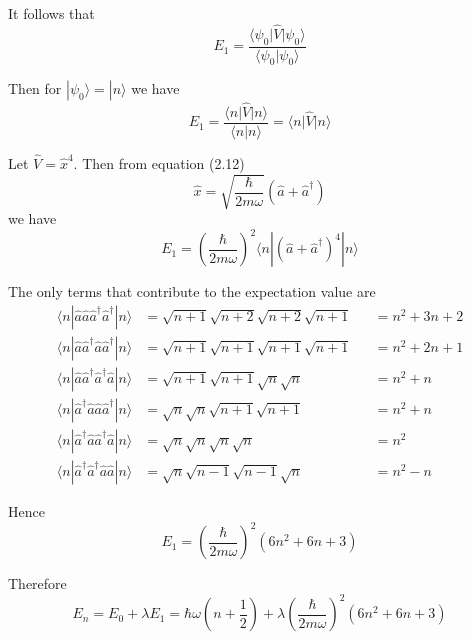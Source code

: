 \documentclass[12pt]{article}
\begin{document}
It follows that
\begin{equation*}
E_1=\frac{\langle\psi_0\vert\hat V\vert\psi_0\rangle}{\langle\psi_0\vert\psi_0\rangle}
\end{equation*}

Then for $|\psi_0\rangle=|n\rangle$ we have
\begin{equation*}
E_1=\frac{\langle n\vert\hat V\vert n\rangle}{\langle n\vert n\rangle}
=\langle n\vert\hat V\vert n\rangle
\end{equation*}

Let $\hat V=\hat x^4$.
Then from equation (2.12)
\begin{equation*}
\hat x=\sqrt{\frac{\hbar}{2m\omega}}\left(\hat a+\hat a^\dag\right)
\tag{2.12}
\end{equation*}
we have
\begin{equation*}
E_1=\left(\frac{\hbar}{2m\omega}\right)^2
\langle n|\left(\hat a+\hat a^\dag\right)^4|n\rangle
\end{equation*}

The only terms that contribute to the expectation value are
\begin{align*}
\langle n|\hat a\hat a\hat a^\dag\hat a^\dag|n\rangle
&=\sqrt{n+1}\sqrt{n+2}\sqrt{n+2}\sqrt{n+1}
& {}&=n^2+3n+2
\\
\langle n|\hat a\hat a^\dag\hat a\hat a^\dag|n\rangle
&=\sqrt{n+1}\sqrt{n+1}\sqrt{n+1}\sqrt{n+1}
& {}&=n^2+2n+1
\\
\langle n|\hat a\hat a^\dag\hat a^\dag\hat a|n\rangle
&=\sqrt{n + 1}\sqrt{n + 1}\sqrt{n}\sqrt{n}
& {}&=n^2+n
\\
\langle n|\hat a^\dag\hat a\hat a\hat a^\dag|n\rangle
&=\sqrt{n}\sqrt{n}\sqrt{n+1}\sqrt{n+1}
& {}&=n^2+n
\\
\langle n|\hat a^\dag\hat a\hat a^\dag\hat a|n\rangle
&=\sqrt{n}\sqrt{n}\sqrt{n}\sqrt{n}
& {}&=n^2
\\
\langle n|\hat a^\dag\hat a^\dag\hat a\hat a|n\rangle
&=\sqrt{n}\sqrt{n-1}\sqrt{n-1}\sqrt{n}
& {}&=n^2-n
\end{align*}

Hence
\begin{equation*}
E_1=\left(\frac{\hbar}{2m\omega}\right)^2\left(6n^2+6n+3\right)
\end{equation*}

Therefore
\begin{equation*}
E_n=E_0+\lambda E_1=\hbar\omega\left(n+\frac{1}{2}\right)
+\lambda\left(\frac{\hbar}{2m\omega}\right)^2\left(6n^2+6n+3\right)
\end{equation*}
\end{document}
